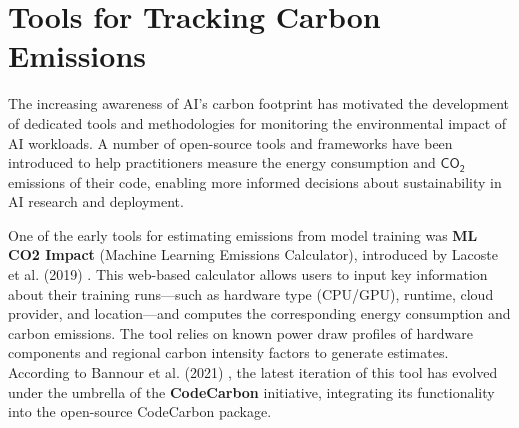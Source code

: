 \documentclass[a4paper,singleside,12pt]{report} %
\begin{document}
\section{Tools for Tracking Carbon Emissions}

The increasing awareness of AI’s carbon footprint has motivated the development of dedicated tools and methodologies for monitoring 
the environmental impact of AI workloads. A number of open-source tools and frameworks have been introduced to help practitioners 
measure the energy consumption and $\mathsf{CO_2}$ emissions of their code, enabling more informed decisions about sustainability 
in AI research and deployment.

One of the early tools for estimating emissions from model training was \textbf{ML CO2 Impact} (Machine Learning 
Emissions Calculator), introduced by Lacoste et al. (2019) \cite{lacoste2019quantifying}. This web-based calculator allows users 
to input key information about their training runs—such as hardware type (CPU/GPU), runtime, cloud provider, and location—and 
computes the corresponding energy consumption and carbon emissions. The tool relies on known power draw profiles of hardware 
components and regional carbon intensity factors to generate estimates. According to Bannour et al. (2021) 
\cite{bannour-etal-2021-evaluating}, the latest iteration of this tool has evolved under the umbrella of the \textbf{CodeCarbon} 
initiative, integrating its functionality into the open-source CodeCarbon package.
\end{document}
